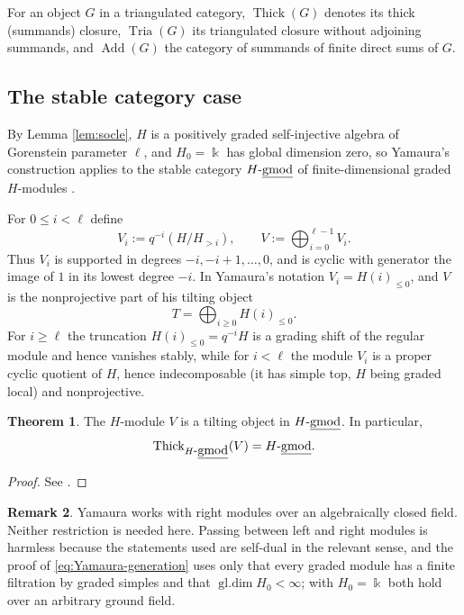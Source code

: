 \documentclass[11pt]{article}
\theoremstyle{definition}
\newtheorem{thm}{Theorem}[section]
\newtheorem{rem}[thm]{Remark}
\numberwithin{equation}{section}
\def\udgmod{\mbox{-\underline{gmod}}}
\newcommand{\kk}{\Bbbk}
\newcommand{\tria}{\operatorname{Tria}}
\newcommand{\thick}{\operatorname{Thick}}
\newcommand{\add}{\operatorname{Add}}
\begin{document}
For an object $G$ in a triangulated category, $\thick(G)$ denotes its
thick (summands) closure, $\tria(G)$ its triangulated closure without adjoining
summands, and $\add(G)$ the category of summands of finite direct sums
of $G$.

\subsection{The stable category case}
By Lemma \ref{lem:socle}, $H$ is a positively graded self-injective algebra of Gorenstein parameter $\ell$, and $H_0=\kk$ has global dimension zero, so Yamaura's construction applies to the stable category $H\udgmod$ of finite-dimensional graded $H$-modules \cite[Theorem 3.3]{Yamaura}.

For $0\le i<\ell$ define
\begin{equation}\label{eq:YamauraVi}
V_i:=q^{-i}(H/H_{>i}),
\qquad
V:=\bigoplus_{i=0}^{\ell-1}V_i .
\end{equation}
Thus $V_i$ is supported in degrees $-i,-i+1,\dots,0$, and is cyclic with generator the image of $1$ in its lowest degree $-i$.  In Yamaura's notation $V_i=H(i)_{\le 0}$, and $V$ is the nonprojective part of his tilting object
\[
T=\bigoplus_{i\ge0}H(i)_{\le0} .
\]
For $i\ge\ell$ the truncation $H(i)_{\le0}=q^{-i}H$ is a grading shift of the regular module and hence vanishes stably, while for $i<\ell$ the module $V_i$ is a proper cyclic quotient of $H$, hence indecomposable (it has simple top, $H$ being graded local) and nonprojective.  

\begin{thm}\label{thm:Yamaura}
The $H$-module $V$ is a tilting object in $H\udgmod$. In particular,
\begin{equation}\label{eq:Yamaura-generation}
\thick_{H\udgmod}(V)=H\udgmod .
\end{equation}
\end{thm}
\begin{proof}
See \cite[Theorem 3.3]{Yamaura}. 
\end{proof}

\begin{rem}\label{rem:yamaura-hypotheses}
Yamaura works with right modules over an algebraically closed field.  Neither restriction is needed here.  Passing between left and right modules is harmless because the statements used are self-dual in the relevant sense, and the proof of \eqref{eq:Yamaura-generation} \cite[Lemma 3.5]{Yamaura} uses only that every graded module has a finite filtration by graded simples and that $\operatorname{gl.dim}H_0<\infty$; with $H_0=\kk$ both hold over an arbitrary ground field.
\end{rem}
\end{document}
